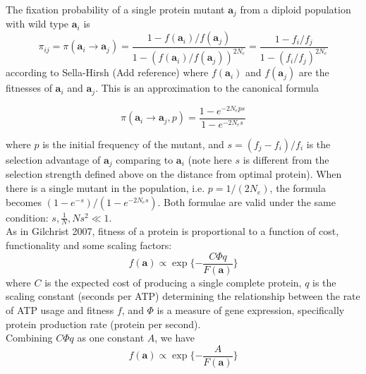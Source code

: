\documentclass[13pt]{article}
\begin{document}
The fixation probability of a single protein mutant $\mathbf{a}_j$ from a diploid population with wild type $\mathbf{a}_i$ is 
\begin{equation}
\pi_{ij} = \pi(\mathbf{a}_i \rightarrow \mathbf{a}_j ) = \frac{1-f(\mathbf{a}_i)/f(\mathbf{a}_j)}{1-(f(\mathbf{a}_i)/f(\mathbf{a}_j))^{2N_e}} = \frac{1-f_i/f_j}{1-(f_i/f_j)^{2N_e}}
\label{eq:fixation}
\end{equation}
according to Sella-Hirsh (Add reference)
where $f(\mathbf{a}_i)$ and $f(\mathbf{a}_j)$ are the fitnesses of $\mathbf{a}_i$ and $\mathbf{a}_j$. This is an approximation to the canonical formula 

\begin{equation}
\pi(\mathbf{a}_i \rightarrow \mathbf{a}_j,p) = \frac{1-e^{-2N_e ps}}{1-e^{-2N_es}}
\label{eq:fixcanonical}
\end{equation}

\noindent where $p$ is the initial frequency of the mutant, and $s=(f_j-f_i)/f_i$ is the selection advantage of $\mathbf{a}_j$ comparing to $\mathbf{a}_i$ (note here $s$  is different from the selection strength defined above on the distance from optimal protein).
When there is a single mutant in the population, i.e. $p=1/(2N_e)$, the formula becomes
$(1-e^{-s})/(1-e^{-2N_es})$. Both formulae are valid under the same condition: $s, \frac{1}{N}, Ns^2 \ll 1$.\\


 
As in Gilchrist 2007, fitness of a protein is proportional to a function of cost, functionality and some scaling factors:
\[f(\mathbf{a}) \propto \exp\{-\frac{C\Phi q}{F(\mathbf{a})}\}\]
where $C$ is the expected cost of producing a single complete protein, $q$ is the scaling constant (seconds per ATP) determining the relationship between the rate of ATP usage and fitness $f$, and $\Phi$ is a measure of gene expression, specifically protein production rate (protein per second). \\

Combining $C\Phi q$ as one constant $A$, we have
\[ f(\mathbf{a}) \propto \exp\{-\frac{A}{F(\mathbf{a})}\} \]
\end{document}
